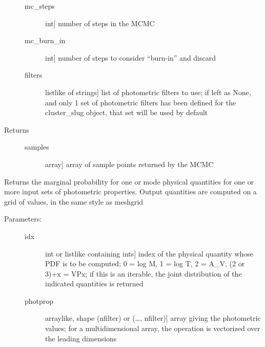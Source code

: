 \documentclass[letterpaper,10pt,english]{sphinxmanual}
\begin{document}
\begin{fulllineitems}
\begin{fulllineitems}
\begin{description}
\begin{description}
\item[{mc\_steps}] \leavevmode{[}int{]}
number of steps in the MCMC

\item[{mc\_burn\_in}] \leavevmode{[}int{]}
number of steps to consider “burn-in” and discard

\item[{filters}] \leavevmode{[}listlike of strings{]}
list of photometric filters to use; if left as None, and
only 1 set of photometric filters has been defined for
the cluster\_slug object, that set will be used by
default

\end{description}

\item[{Returns}] \leavevmode\begin{description}
\item[{samples}] \leavevmode{[}array{]}
array of sample points returned by the MCMC

\end{description}

\end{description}

\end{fulllineitems}


\begin{fulllineitems}
\label{\detokenize{cluster_slug:slugpy.cluster_slug.cluster_slug.mpdf}}
Returns the marginal probability for one or mode physical
quantities for one or more input sets of photometric
properties. Output quantities are computed on a grid of
values, in the same style as meshgrid
\begin{description}
\item[{Parameters:}] \leavevmode\begin{description}
\item[{idx}] \leavevmode{[}int or listlike containing ints{]}
index of the physical quantity whose PDF is to be
computed; 0 = log M, 1 = log T, 2 = A\_V, (2 or 3)+x = VPx; 
if this is an iterable, the joint distribution of the indicated
quantities is returned

\item[{photprop}] \leavevmode{[}arraylike, shape (nfilter) or (…, nfilter){]}
array giving the photometric values; for a
multidimensional array, the operation is vectorized over
the leading dimensions


\end{description}
\end{description}
\end{fulllineitems}
\end{fulllineitems}
\end{document}
